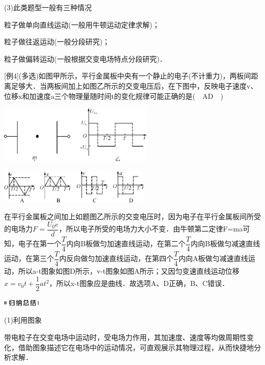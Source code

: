 \documentclass[cn,10.5pt,chinese,mac,chinesefont=founder]{elegantbook}
\begin{document}
(3)此类题型一般有三种情况

粒子做单向直线运动(一般用牛顿运动定律求解)；

粒子做往返运动(一般分段研究)；

粒子做偏转运动(一般根据交变电场特点分段研究)．

{[}例4{]}(多选)如图甲所示，平行金属板中央有一个静止的电子(不计重力)，两板间距离足够大．当两板间加上如图乙所示的交变电压后，在下图中，反映电子速度v、位移x和加速度a三个物理量随时间t的变化规律可能正确的是(　AD　)

\begin{center}\includegraphics[width=2.91667in,height=1.08333in]{media/image301.png}\end{center}
\begin{center}\includegraphics[width=2.85417in,height=0.64583in]{media/image302.png}\end{center}

\begin{solution}
	在平行金属板之间加上如题图乙所示的交变电压时，因为电子在平行金属板间所受的电场力$F=\dfrac{U_{0} e}{d}$，所以电子所受的电场力大小不变．由牛顿第二定律F=ma可知，电子在第一个$\dfrac{T}{4}$内向B板做匀加速直线运动，在第二个$\dfrac{T}{4}$内向B板做匀减速直线运动，在第三个$\dfrac{T}{4}$内反向做匀加速直线运动，在第四个$\dfrac{T}{4}$内向A板做匀减速直线运动，所以a-t图象如图D所示，v-t图象如图A所示；又因匀变速直线运动位移$x=v_0t+\dfrac{1}{2}at^2$，所以x-t图象应是曲线．故选项A、D正确，B、C错误．
\end{solution}
\begin{center}\includegraphics[width=0.70833in,height=0.125in]{media/image13.png}\end{center}

(1)利用图象

带电粒子在交变电场中运动时，受电场力作用，其加速度、速度等均做周期性变化，借助图象描述它在电场中的运动情况，可直观展示其物理过程，从而快捷地分析求解．
\end{document}
